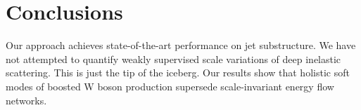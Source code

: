 \section{Conclusions}\label{sec:conclusions}

Our approach achieves state-of-the-art performance on jet substructure.
We have not attempted to quantify weakly supervised scale variations of
deep inelastic scattering. This is just the tip of the iceberg. Our
results show that holistic soft modes of boosted W boson production
supersede scale-invariant energy flow networks.

